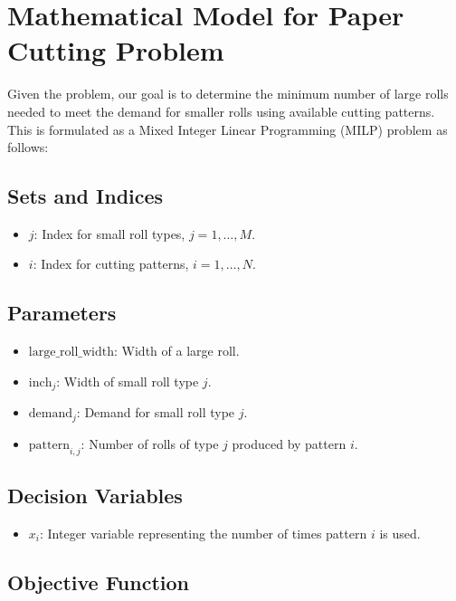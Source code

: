 \documentclass{article}
\begin{document}
\section*{Mathematical Model for Paper Cutting Problem}

Given the problem, our goal is to determine the minimum number of large rolls needed to meet the demand for smaller rolls using available cutting patterns. This is formulated as a Mixed Integer Linear Programming (MILP) problem as follows:

\subsection*{Sets and Indices}
\begin{itemize}
    \item \( j \): Index for small roll types, \( j = 1, \ldots, M \).
    \item \( i \): Index for cutting patterns, \( i = 1, \ldots, N \).
\end{itemize}

\subsection*{Parameters}
\begin{itemize}
    \item \( \text{large\_roll\_width} \): Width of a large roll.
    \item \( \text{inch}_j \): Width of small roll type \( j \).
    \item \( \text{demand}_j \): Demand for small roll type \( j \).
    \item \( \text{pattern}_{i,j} \): Number of rolls of type \( j \) produced by pattern \( i \).
\end{itemize}

\subsection*{Decision Variables}
\begin{itemize}
    \item \( x_i \): Integer variable representing the number of times pattern \( i \) is used.
\end{itemize}

\subsection*{Objective Function}
\end{document}
